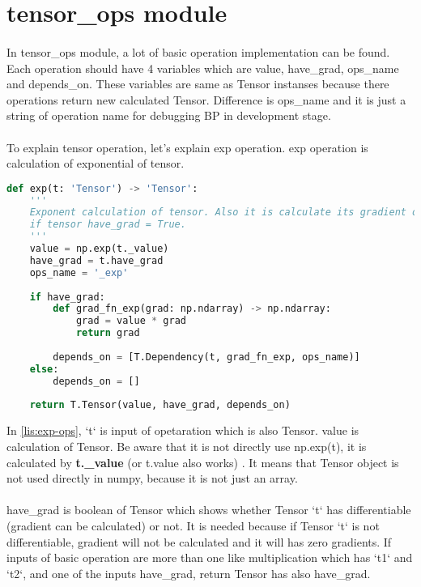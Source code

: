 \documentclass[12pt]{report}
\begin{document}
\section{tensor\_ops module}
\paragraph{}
In tensor\_ops module, a lot of basic operation implementation can be found. Each operation should have 4 variables which are value, have\_grad, ops\_name and depends\_on. These variables are same as Tensor instanses because there operations return new calculated Tensor. Difference is ops\_name and it is just a string of operation name for debugging BP in development stage. 

\paragraph{}
To explain tensor operation, let's explain exp operation. exp operation is calculation of exponential of tensor. 

\begin{lstlisting}[language=Python, numbers=none, numbers=none, caption={exp operation.}, label={lis:exp-ops}]
def exp(t: 'Tensor') -> 'Tensor':
	'''
	Exponent calculation of tensor. Also it is calculate its gradient of operation 
	if tensor have_grad = True.
	'''
	value = np.exp(t._value)
	have_grad = t.have_grad
	ops_name = '_exp'
	
	if have_grad:
		def grad_fn_exp(grad: np.ndarray) -> np.ndarray:
			grad = value * grad
			return grad
	
		depends_on = [T.Dependency(t, grad_fn_exp, ops_name)]
	else:
		depends_on = []
	
	return T.Tensor(value, have_grad, depends_on)
\end{lstlisting}

In \ref{lis:exp-ops}, `t` is input of opetaration which is also Tensor. value is calculation of Tensor. Be aware that it is not directly use np.exp(t), it is calculated by \textbf{t.\_value} (or t.value also works) . It means that Tensor object is not used directly in numpy, because it is not just an array. 

\paragraph{}
have\_grad is boolean of Tensor which shows whether Tensor `t` has differentiable (gradient can be calculated) or not. It is needed because if Tensor `t` is not differentiable, gradient will not be calculated and it will has zero gradients. If inputs of basic operation are more than one like multiplication which has `t1` and `t2`, and one of the inputs have\_grad, return Tensor has also have\_grad.
\end{document}
